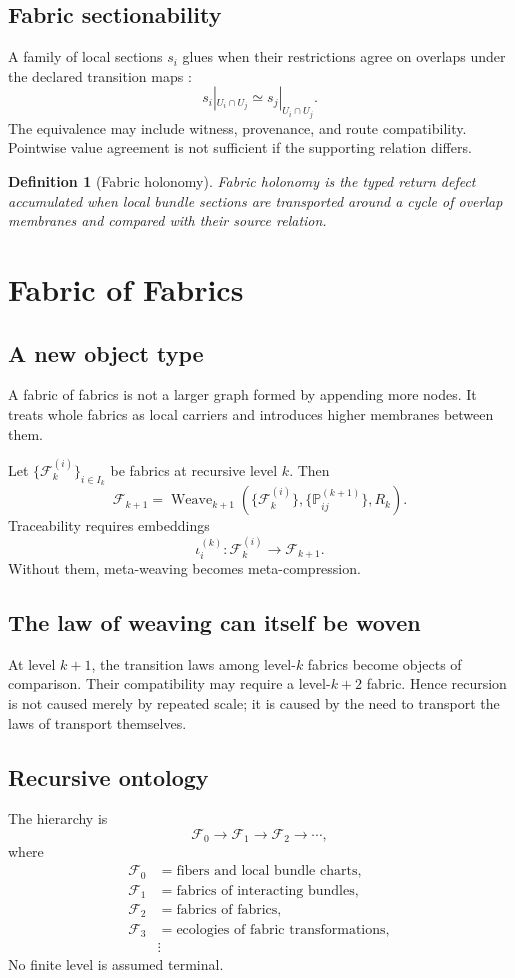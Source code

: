 \documentclass[12pt,openany]{book}
\newtheorem{definition}{Definition}[chapter]
\theoremstyle{remark}
\DeclareMathOperator{\Weave}{Weave}
\newcommand{\Fabric}{\mathcal F}
\begin{document}
\section{Fabric sectionability}
A family of local sections $s_i$ glues when their restrictions agree on overlaps under the declared transition maps \cite{MacLaneMoerdijk}:
\[
s_i|_{U_i\cap U_j}
\simeq
s_j|_{U_i\cap U_j}.
\]
The equivalence may include witness, provenance, and route compatibility. Pointwise value agreement is not sufficient if the supporting relation differs.

\begin{definition}[Fabric holonomy]
Fabric holonomy is the typed return defect accumulated when local bundle sections are transported around a cycle of overlap membranes and compared with their source relation.
\end{definition}

\chapter{Fabric of Fabrics}
\label{ch:fabric-of-fabrics}

\section{A new object type}
A fabric of fabrics is not a larger graph formed by appending more nodes. It treats whole fabrics as local carriers and introduces higher membranes between them.

Let $\{\Fabric_k^{(i)}\}_{i\in I_k}$ be fabrics at recursive level $k$. Then
\[
\Fabric_{k+1}
=
\Weave_{k+1}
\left(
\{\Fabric_k^{(i)}\},
\{\mathbb P_{ij}^{(k+1)}\},
R_k
\right).
\]
Traceability requires embeddings
\[
\iota_i^{(k)}:
\Fabric_k^{(i)}\longrightarrow\Fabric_{k+1}.
\]
Without them, meta-weaving becomes meta-compression.

\section{The law of weaving can itself be woven}
At level $k+1$, the transition laws among level-$k$ fabrics become objects of comparison. Their compatibility may require a level-$k+2$ fabric. Hence recursion is not caused merely by repeated scale; it is caused by the need to transport the laws of transport themselves.

\section{Recursive ontology}
The hierarchy is
\[
\Fabric_0
\to
\Fabric_1
\to
\Fabric_2
\to\cdots,
\]
where
\[
\begin{aligned}
\Fabric_0&=\text{fibers and local bundle charts},\\
\Fabric_1&=\text{fabrics of interacting bundles},\\
\Fabric_2&=\text{fabrics of fabrics},\\
\Fabric_3&=\text{ecologies of fabric transformations},\\
&\vdots
\end{aligned}
\]
No finite level is assumed terminal.
\end{document}
